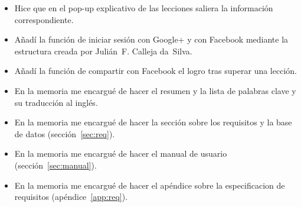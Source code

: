 \begin{itemize}
\item
Hice que en el pop-up explicativo de las lecciones saliera la información correspondiente.

\item
Añadí la función de iniciar sesión con Google+ y con Facebook mediante la estructura creada por
Julián~F. Calleja da~Silva.

\item
Añadí la función de compartir con Facebook el logro tras superar una lección.

\item
En la memoria me encargué de hacer el resumen y la lista de palabras clave y su traducción al inglés.

\item
En la memoria me encargué de hacer la sección sobre los requisitos y la base de datos
(sección~\ref{sec:req}).

\item
En la memoria me encargué de hacer el manual de usuario (sección~\ref{sec:manual}).

\item
En la memoria me encargué de hacer el apéndice sobre la especificacion de requisitos
(apéndice~\ref{app:req}).

\end{itemize}